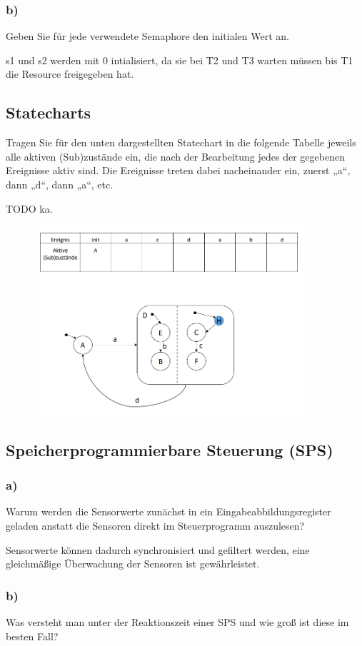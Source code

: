 \subsubsection{b)}
Geben Sie für jede verwendete Semaphore den initialen Wert an.

s1 und s2 werden mit 0 intialisiert, da sie bei T2 und T3 warten müssen bis T1 die Resource freigegeben hat.

\subsection{Statecharts}
Tragen Sie für den unten dargestellten Statechart in die folgende Tabelle jeweils alle aktiven (Sub)zustände
ein, die nach der Bearbeitung jedes der gegebenen Ereignisse aktiv sind. Die Ereignisse treten dabei
nacheinander ein, zuerst „a“, dann „d“, dann „a“, etc.

TODO ka.
\begin{figure}
  \includegraphics[width=10cm]{images/KA020222/5a.PNG}
  \centering
\end{figure}

\subsection{Speicherprogrammierbare Steuerung (SPS)}
\subsubsection{a)}
Warum werden die Sensorwerte zunächst in ein Eingabeabbildungsregister geladen anstatt die
Sensoren direkt im Steuerprogramm auszulesen?

Sensorwerte können dadurch synchronisiert und gefiltert werden, eine gleichmäßige Überwachung der Sensoren ist gewährleistet.

\subsubsection{b)}
Was versteht man unter der Reaktionszeit einer SPS und wie groß ist diese im besten Fall?

